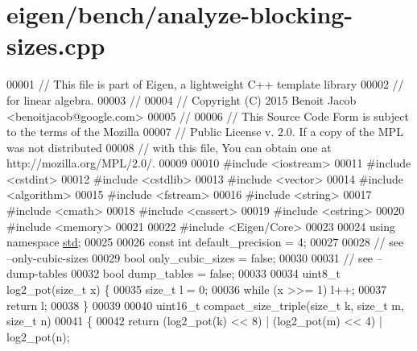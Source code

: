 \hypertarget{eigen_2bench_2analyze-blocking-sizes_8cpp_source}{}\section{eigen/bench/analyze-\/blocking-\/sizes.cpp}
\label{eigen_2bench_2analyze-blocking-sizes_8cpp_source}

\begin{DoxyCode}
00001 \textcolor{comment}{// This file is part of Eigen, a lightweight C++ template library}
00002 \textcolor{comment}{// for linear algebra.}
00003 \textcolor{comment}{//}
00004 \textcolor{comment}{// Copyright (C) 2015 Benoit Jacob <benoitjacob@google.com>}
00005 \textcolor{comment}{//}
00006 \textcolor{comment}{// This Source Code Form is subject to the terms of the Mozilla}
00007 \textcolor{comment}{// Public License v. 2.0. If a copy of the MPL was not distributed}
00008 \textcolor{comment}{// with this file, You can obtain one at http://mozilla.org/MPL/2.0/.}
00009 
00010 \textcolor{preprocessor}{#include <iostream>}
00011 \textcolor{preprocessor}{#include <cstdint>}
00012 \textcolor{preprocessor}{#include <cstdlib>}
00013 \textcolor{preprocessor}{#include <vector>}
00014 \textcolor{preprocessor}{#include <algorithm>}
00015 \textcolor{preprocessor}{#include <fstream>}
00016 \textcolor{preprocessor}{#include <string>}
00017 \textcolor{preprocessor}{#include <cmath>}
00018 \textcolor{preprocessor}{#include <cassert>}
00019 \textcolor{preprocessor}{#include <cstring>}
00020 \textcolor{preprocessor}{#include <memory>}
00021 
00022 \textcolor{preprocessor}{#include <Eigen/Core>}
00023 
00024 \textcolor{keyword}{using namespace }\hyperlink{namespacestd}{std};
00025 
00026 \textcolor{keyword}{const} \textcolor{keywordtype}{int} default\_precision = 4;
00027 
00028 \textcolor{comment}{// see --only-cubic-sizes}
00029 \textcolor{keywordtype}{bool} only\_cubic\_sizes = \textcolor{keyword}{false};
00030 
00031 \textcolor{comment}{// see --dump-tables}
00032 \textcolor{keywordtype}{bool} dump\_tables = \textcolor{keyword}{false};
00033 
00034 uint8\_t log2\_pot(\textcolor{keywordtype}{size\_t} x) \{
00035   \textcolor{keywordtype}{size\_t} l = 0;
00036   \textcolor{keywordflow}{while} (x >>= 1) l++;
00037   \textcolor{keywordflow}{return} l;
00038 \}
00039 
00040 uint16\_t compact\_size\_triple(\textcolor{keywordtype}{size\_t} k, \textcolor{keywordtype}{size\_t} m, \textcolor{keywordtype}{size\_t} n)
00041 \{
00042   \textcolor{keywordflow}{return} (log2\_pot(k) << 8) | (log2\_pot(m) << 4) | log2\_pot(n);

\end{DoxyCode}
